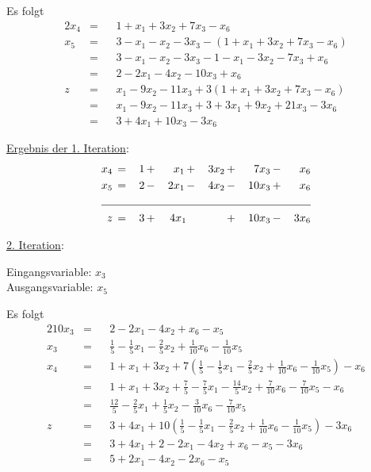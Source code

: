 \documentclass[10pt,a4paper,oneside,ngerman,numbers=noenddot]{scrartcl}
\begin{document}
	Es folgt
	\begin{alignat*}{2}
		x_{4} &=&& 1 + x_{1} + 3x_{2} + 7x_{3} - x_{6} \\
		x_{5} &=&& 3 - x_{1} - x_{2} - 3x_{3} - \left(1 + x_{1} + 3x_{2} + 7x_{3} - x_{6}\right) \\
		&=&& 3 - x_{1} - x_{2} - 3x_{3} - 1 - x_{1} - 3x_{2} - 7x_{3} + x_{6} \\
		&=&& 2 - 2x_{1} - 4x_{2} - 10x_{3} + x_{6} \\
		z &=&& x_{1} - 9x_{2} - 11x_{3} + 3\left(1 + x_{1} + 3x_{2} + 7x_{3} - x_{6}\right) \\
		&=&& x_{1} - 9x_{2} - 11x_{3} + 3 + 3x_{1} + 9x_{2} + 21x_{3} - 3x_{6} \\
		&=&& 3 + 4x_{1} + 10x_{3} - 3x_{6}
	\end{alignat*}
		
	\underline{Ergebnis der 1. Iteration}:
	\begin{alignat*}{6}
			x_{4} \,&=&\, 1 \,&+&\, x_{1} \,&+&\, 3x_{2} \,&+&\, 7x_{3} \,&-&\, x_{6} \\
			x_{5} \,&=&\, 2 \,&-&\, 2x_{1} \,&-&\, 4x_{2} \,&-&\, 10x_{3} \,&+&\, x_{6} \\ \cline{1 - 11}
			z \,&=&\, 3 \,&+&\, 4x_{1} && \,&+&\, 10x_{3} \,&-&\, 3x_{6}
	\end{alignat*}
		
	\underline{2. Iteration}:
	
	Eingangsvariable: $x_{3}$ \\
	Ausgangsvariable: $x_{5}$
		
	Es folgt
	\begin{alignat*}{2}
		10x_{3} &=&& 2 - 2x_{1} - 4x_{2} + x_{6} - x_{5} \\
		x_{3} &=&& \frac{1}{5} - \frac{1}{5}x_{1} - \frac{2}{5}x_{2}  + \frac{1}{10}x_{6} - \frac{1}{10}x_{5} \\
		x_{4} &=&& 1 + x_{1} + 3x_{2} + 7\left(\frac{1}{5} - \frac{1}{5}x_{1} - \frac{2}{5}x_{2}  + \frac{1}{10}x_{6} - \frac{1}{10}x_{5}\right) - x_{6} \\
		&=&& 1 + x_{1} + 3x_{2} + \frac{7}{5} - \frac{7}{5}x_{1} - \frac{14}{5}x_{2} + \frac{7}{10}x_{6} - \frac{7}{10}x_{5} - x_{6}  \\
		&=&& \frac{12}{5} - \frac{2}{5}x_{1} + \frac{1}{5}x_{2} - \frac{3}{10}x_{6} - \frac{7}{10}x_{5} \\
		z &=&& 3 + 4x_{1} + 10\left(\frac{1}{5} - \frac{1}{5}x_{1} - \frac{2}{5}x_{2}  + \frac{1}{10}x_{6} - \frac{1}{10}x_{5}\right) - 3x_{6} \\
		&=&& 3 + 4x_{1} + 2 - 2x_{1} - 4x_{2} + x_{6} - x_{5} - 3x_{6} \\
		&=&& 5 + 2x_{1} - 4x_{2} - 2x_{6} - x_{5}
	\end{alignat*}
		
\end{document}

